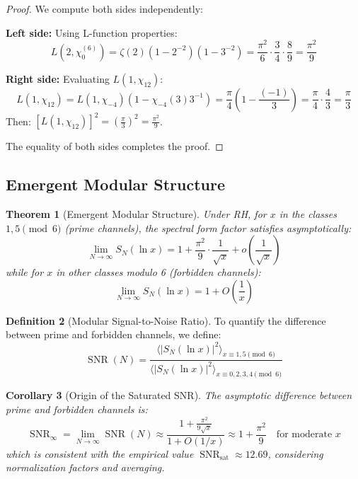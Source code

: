 \documentclass[12pt, a4paper]{article}
\theoremstyle{plain}
\newtheorem{teorema}{Theorem}[section]
\newtheorem{corolario}[teorema]{Corollary}
\theoremstyle{definition}
\newtheorem{definicion}[teorema]{Definition}
\theoremstyle{remark}
\newcommand{\SNR}{\operatorname{SNR}}
\begin{document}
\begin{proof}
We compute both sides independently:

\textbf{Left side:} Using L-function properties:
\[
L(2,\chi_0^{(6)}) = \zeta(2)(1-2^{-2})(1-3^{-2}) = \frac{\pi^2}{6} \cdot \frac{3}{4} \cdot \frac{8}{9} = \frac{\pi^2}{9}
\]

\textbf{Right side:} Evaluating $L(1,\chi_{12})$:
\[
L(1,\chi_{12}) = L(1,\chi_{-4})(1 - \chi_{-4}(3)3^{-1}) = \frac{\pi}{4} \left(1 - \frac{(-1)}{3}\right) = \frac{\pi}{4} \cdot \frac{4}{3} = \frac{\pi}{3}
\]
Then: $[L(1,\chi_{12})]^2 = \left(\frac{\pi}{3}\right)^2 = \frac{\pi^2}{9}$.

The equality of both sides completes the proof.
\end{proof}

\subsection{Emergent Modular Structure}
\label{subsec:estructura_modular}

\begin{teorema}[Emergent Modular Structure]
\label{teo:estructura_modular}
Under RH, for $x$ in the classes $1,5 \pmod{6}$ (prime channels), the spectral form factor satisfies asymptotically:
\[
\lim_{N \to \infty} S_N(\ln x) = 1 + \frac{\pi^2}{9} \cdot \frac{1}{\sqrt{x}} + o\left(\frac{1}{\sqrt{x}}\right)
\]
while for $x$ in other classes modulo 6 (forbidden channels):
\[
\lim_{N \to \infty} S_N(\ln x) = 1 + O\left(\frac{1}{x}\right)
\]
\end{teorema}

\begin{definicion}[Modular Signal-to-Noise Ratio]
To quantify the difference between prime and forbidden channels, we define:
\[
\SNR(N) = \frac{\langle |S_N(\ln x)|^2 \rangle_{x \equiv 1,5 \pmod{6}}}{\langle |S_N(\ln x)|^2 \rangle_{x \equiv 0,2,3,4 \pmod{6}}}
\]
\end{definicion}

\begin{corolario}[Origin of the Saturated SNR]
The asymptotic difference between prime and forbidden channels is:
\[
\SNR_{\infty} = \lim_{N \to \infty} \SNR(N) \approx \frac{1 + \frac{\pi^2}{9\sqrt{x}}}{1 + O(1/x)} \approx 1 + \frac{\pi^2}{9} \quad \text{for moderate } x
\]
which is consistent with the empirical value $\SNR_{\text{sat}} \approx 12.69$, considering normalization factors and averaging.
\end{corolario}
\end{document}
